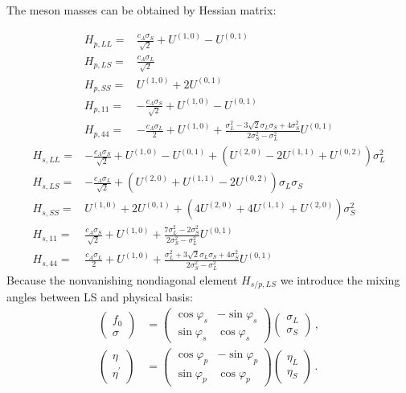 \documentclass[%
reprint,
superscriptaddress,
showpacs,preprintnumbers,
amsmath,amssymb,
aps,
prd,
]{revtex4-1}
\begin{document}
The meson masses can be obtained by Hessian matrix:

\begin{align}
H_{p,LL}=&\frac{c_A \sigma_S}{\sqrt{2}}+U^{(1,0)}-U^{(0,1)}\\
H_{p,LS}=&\frac{c_A \sigma_L}{\sqrt{2}}\\
H_{p,SS}=&U^{(1,0)}+2 U^{(0,1)}\\
H_{p,11}=&-\frac{c_A \sigma_S}{\sqrt{2}}+U^{(1,0)}-U^{(0,1)}\\
H_{p,44}=&- \frac{c_A \sigma_L}{2} + U^{(1,0)} + \frac{\sigma_L^2- 3 \sqrt{2} \sigma_L \sigma_S+4 \sigma_S^2}{2 \sigma_S^2-\sigma_L^2} U^{(0,1)}
\end{align}
\begin{align}
H_{s,LL}=&-\frac{c_A \sigma_S}{\sqrt{2}}+U^{(1,0)}-U^{(0,1)} +(U^{(2,0)} -2U^{(1,1)}+U^{(0,2)})\sigma_L^2\\
H_{s,LS}=&-\frac{c_A \sigma_L}{\sqrt{2}}+(U^{(2,0)}+U^{(1,1)}-2U^{(0,2)}) \sigma_L \sigma_S\\
H_{s,SS}=&U^{(1,0)}+2 U^{(0,1)} +(4 U^{(2,0)}+4U^{(1,1)}+U^{(2,0)})\sigma_S^2 \\
H_{s,11}=&\frac{c_A \sigma_S}{\sqrt{2}}+U^{(1,0)} +\frac{7 \sigma_L^2 - 2 \sigma_S^2}{2 \sigma_S^2-\sigma_L^2}U^{(0,1)}\\
H_{s,44}=&\frac{c_A \sigma_L}{2}+U^{(1,0)}+\frac{\sigma_L^2+3 \sqrt{2} \sigma_L\sigma_S+4 \sigma_S^2}{2 \sigma_S^2-\sigma_L^2}U^{(0,1)}
\end{align}
Because the nonvanishing nondiagonal element $H_{s/p,LS}$
we introduce the mixing angles between LS and physical basis:
\begin{align}\label{eq:plstrafo}
\begin{pmatrix}f_0 \\ \sigma \end{pmatrix} &= \begin{pmatrix} \cos\varphi_s & - \sin\varphi_s \\ \sin\varphi_s & \cos\varphi_s \end{pmatrix} \begin{pmatrix}\sigma_L \\ \sigma_S \end{pmatrix}\,,\\
\begin{pmatrix}\eta \\ \eta^\prime \end{pmatrix} &= \begin{pmatrix} \cos\varphi_p & - \sin\varphi_p \\ \sin\varphi_p & \cos\varphi_p \end{pmatrix} \begin{pmatrix}\eta_L \\ \eta_S \end{pmatrix}\,.
\end{align}
\end{document}

